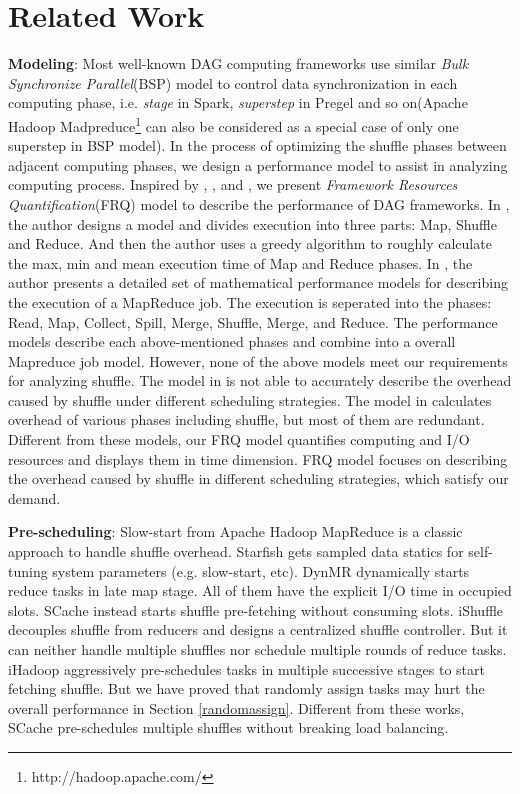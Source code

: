 \section{Related Work}

{\color{blue}
\textbf{Modeling}: Most well-known DAG computing frameworks use similar \textit{Bulk Synchronize Parallel}(BSP)\cite{valiant1990bridging} model to control data synchronization in each computing phase, i.e. \textit{stage} in Spark, \textit{superstep} in Pregel\cite{malewicz2010pregel} and so on(Apache Hadoop Madpreduce\footnote{http://hadoop.apache.com/} can also be considered as a special case of only one superstep in BSP model). 
In the process of optimizing the shuffle phases between adjacent computing phases, we design a performance model to assist in analyzing computing process.
Inspired by \cite{verma2011aria}, \cite{herodotou2011hadoop}, and \cite{polo2010performance}, we present \textit{Framework Resources Quantification}(FRQ) model to describe the performance of DAG frameworks.
In \cite{verma2011aria}, the author designs a model and divides execution into three parts: Map, Shuffle and Reduce. And then the author uses a greedy algorithm to roughly calculate the max, min and mean execution time of Map and Reduce phases.
In \cite{herodotou2011hadoop}, the author presents a detailed set of mathematical performance models for describing the execution of a MapReduce job. The execution is seperated into the phases: Read, Map, Collect, Spill, Merge, Shuffle, Merge, and Reduce. The performance models describe each above-mentioned phases and combine into a overall Mapreduce job model. 
However, none of the above models meet our requirements for analyzing shuffle.
The model in \cite{verma2011aria} is not able to accurately describe the overhead caused by shuffle under different scheduling strategies. The model in \cite{herodotou2011hadoop} calculates overhead of various phases including shuffle, but most of them are redundant. 
Different from these models, our FRQ model quantifies computing and I/O resources and displays them in time dimension. FRQ model focuses on describing the overhead caused by shuffle in different scheduling strategies, which satisfy our demand.
}

\textbf{Pre-scheduling}: Slow-start from Apache Hadoop MapReduce is a classic approach to handle shuffle overhead. 
Starfish \cite{starfish} gets sampled data statics for self-tuning system parameters (e.g. slow-start, etc). 
DynMR \cite{dynmr} dynamically starts reduce tasks in late map stage. 
All of them have the explicit I/O time in occupied slots. 
SCache instead starts shuffle pre-fetching without consuming slots. 
iShuffle \cite{ishuffle} decouples shuffle from reducers and designs a centralized shuffle controller. 
But it can neither handle multiple shuffles nor schedule multiple rounds of reduce tasks. 
iHadoop \cite{ihadoop} aggressively pre-schedules tasks in multiple successive stages to start fetching shuffle. 
But we have proved that randomly assign tasks may hurt the overall performance in Section \ref{randomassign}. 
Different from these works, SCache pre-schedules multiple shuffles without breaking load balancing. 

